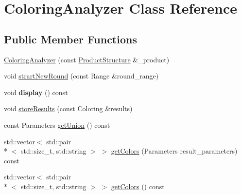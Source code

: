 \hypertarget{class_coloring_analyzer}{\section{Coloring\-Analyzer Class Reference}
\label{class_coloring_analyzer}
}
\subsection*{Public Member Functions}
\begin{DoxyCompactItemize}
\item 
\hyperlink{class_coloring_analyzer_ae86d8dbc9818c5d9f9dcae3e69c6ac69}{Coloring\-Analyzer} (const \hyperlink{class_product_structure}{Product\-Structure} \&\-\_\-product)
\item 
void \hyperlink{class_coloring_analyzer_a78e01b27fdc3fa28b9b369446d537fa1}{strart\-New\-Round} (const Range \&round\-\_\-range)
\item 
\hypertarget{class_coloring_analyzer_a736c00a3dad14517cfc6c863945125e5}{void {\bfseries display} () const }\label{class_coloring_analyzer_a736c00a3dad14517cfc6c863945125e5}

\item 
void \hyperlink{class_coloring_analyzer_aa7484df2b5c1c181a8fcf85af03fbae4}{store\-Results} (const Coloring \&results)
\item 
const Parameters \hyperlink{class_coloring_analyzer_a27d307d164ab19d540049d4dacacd1b2}{get\-Union} () const 
\item 
std\-::vector$<$ std\-::pair\\*
$<$ std\-::size\-\_\-t, std\-::string $>$ $>$ \hyperlink{class_coloring_analyzer_acc00d666ef64880a6b68aac8dfdb1ea5}{get\-Colors} (Parameters result\-\_\-parameters) const 
\item 
std\-::vector$<$ std\-::pair\\*
$<$ std\-::size\-\_\-t, std\-::string $>$ $>$ \hyperlink{class_coloring_analyzer_a9cadf7c60c3972bd1bcbe8e55147a368}{get\-Colors} () const 
\end{DoxyCompactItemize}


